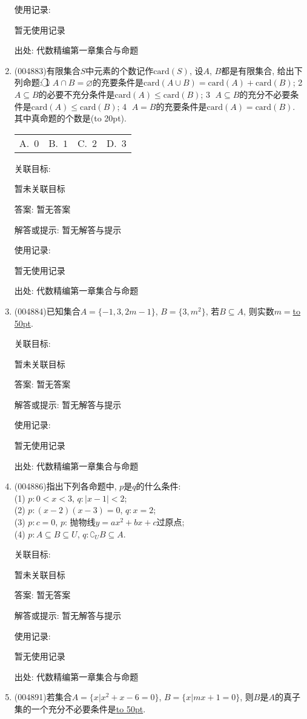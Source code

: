 \documentclass[10pt,a4paper]{article}
\newcommand{\blank}[1]{\underline{\hbox to #1pt{}}}
\newcommand{\bracket}[1]{(\hbox to #1pt{})}
\newcommand{\fourch}[4]{\par\begin{tabular}{p{.23\textwidth}p{.23\textwidth}p{.23\textwidth}p{.23\textwidth}}
A.~#1 &B.~#2& C.~#3& D.~#4
\end{tabular}}
\begin{document}
\begin{enumerate}[1.]
使用记录:

暂无使用记录


出处: 代数精编第一章集合与命题
\item { (004883)}有限集合$S$中元素的个数记作$\mathrm{card}(S)$, 设$A$, $B$都是有限集合, 给出下列命题:
\textcircled{1} $A\cap B=\varnothing$的充要条件是$\mathrm{card}(A\cup B)=\mathrm{card}(A)+\mathrm{card}(B)$; \textcircled{2} $A\subseteq B$的必要不充分条件是$\mathrm{card}(A)\le \mathrm{card}(B)$; \textcircled{3} $A\subseteq B$的充分不必要条件是$\mathrm{card}(A)\le \mathrm{card}(B)$; \textcircled{4} $A=B$的充要条件是$\mathrm{card}(A)=\mathrm{card}(B)$. 
其中真命题的个数是\bracket{20}.
\fourch{$0$}{$1$}{$2$}{$3$}


关联目标:

暂未关联目标

答案: 暂无答案

解答或提示: 暂无解答与提示

使用记录:

暂无使用记录


出处: 代数精编第一章集合与命题
\item { (004884)}已知集合$A=\{-1,3,2m-1\}$, $B=\{3,m^2\}$, 若$B\subseteq A$, 则实数$m=$\blank{50}.


关联目标:

暂未关联目标

答案: 暂无答案

解答或提示: 暂无解答与提示

使用记录:

暂无使用记录


出处: 代数精编第一章集合与命题
\item { (004886)}指出下列各命题中, $p$是$q$的什么条件:\\
(1) $p:0<x<3$, $q:|x-1|<2$;\\
(2) $p:(x-2)(x-3)=0$, $q:x=2$;\\
(3) $p:c=0$, $p$: 抛物线$y=ax^2+bx+c$过原点;\\
(4) $p:A\subseteq B\subseteq U$, $q:\complement_UB\subseteq A$.


关联目标:

暂未关联目标

答案: 暂无答案

解答或提示: 暂无解答与提示

使用记录:

暂无使用记录


出处: 代数精编第一章集合与命题
\item { (004891)}若集合$A=\{x|x^2+x-6=0\}$, $B=\{x|mx+1=0\}$, 则$B$是$A$的真子集的一个充分不必要条件是\blank{50}.



\end{enumerate}
\end{document}

